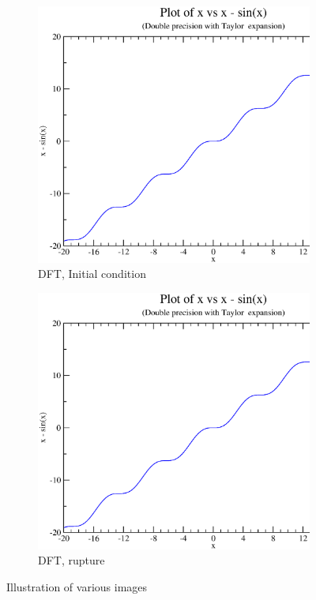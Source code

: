 \documentclass{article}
\begin{document}
\begin{figure}[ht]
\begin{subfigure}[b]{0.5\linewidth}
    \centering
    \includegraphics[width=0.75\linewidth]{images/c.eps} 
    \caption{DFT, Initial condition} 
    \label{fig7:c} 
  \end{subfigure}%
  \begin{subfigure}[b]{0.5\linewidth}
    \centering
    \includegraphics[width=0.75\linewidth]{images/d.eps} 
    \caption{DFT, rupture} 
    \label{fig7:d} 
  \end{subfigure} 
  \caption{Illustration of various images}
  \label{fig7} 
\end{figure}
\end{document}
